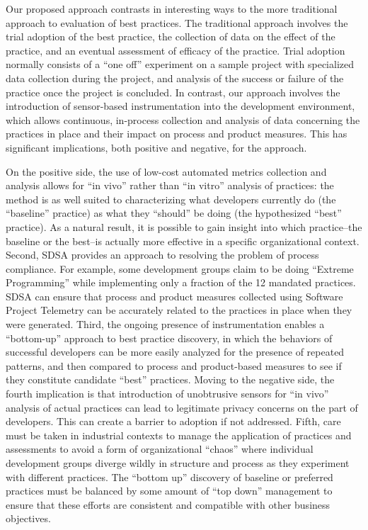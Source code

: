 Our proposed approach contrasts in interesting ways to the more traditional
approach to evaluation of best practices.  The traditional approach
involves the trial adoption of the best practice, the collection of data on
the effect of the practice, and an eventual assessment of efficacy of the
practice.  Trial adoption normally consists of a ``one off'' experiment on
a sample project with specialized data collection during the project, and
analysis of the success or failure of the practice once the project is
concluded.  In contrast, our approach involves the introduction of
sensor-based instrumentation into the development environment, which allows
continuous, in-process collection and analysis of data concerning the
practices in place and their impact on process and product measures.  This
has significant implications, both positive and negative, for the approach.

On the positive side, the use of low-cost automated metrics collection and analysis allows
for ``in vivo'' rather than ``in vitro'' analysis of practices: the method
is as well suited to characterizing what developers currently do (the
``baseline'' practice) as what they ``should'' be doing (the hypothesized
``best'' practice).  As a natural result, it is possible to gain insight
into which practice--the baseline or the best--is actually more effective
in a specific organizational context. Second, SDSA provides an approach to
resolving the problem of process compliance.  For example, some development
groups claim to be doing ``Extreme Programming'' while implementing only a
fraction of the 12 mandated practices.  SDSA can ensure that process and
product measures collected using Software Project Telemetry can be
accurately related to the practices in place when they were generated.
Third, the ongoing presence of instrumentation enables a ``bottom-up''
approach to best practice discovery, in which the behaviors of successful
developers can be more easily analyzed for the presence of repeated
patterns, and then compared to process and product-based measures to see if
they constitute candidate ``best'' practices.  Moving to the negative side,
the fourth implication is that introduction of unobtrusive sensors for ``in
vivo'' analysis of actual practices can lead to legitimate privacy concerns
on the part of developers. This can create a barrier to adoption if not
addressed.  Fifth, care must be taken in industrial contexts to manage the
application of practices and assessments to avoid a form of organizational
``chaos'' where individual development groups diverge wildly in structure
and process as they experiment with different practices. The ``bottom up''
discovery of baseline or preferred practices must be balanced by some amount of ``top
down'' management to ensure that these efforts are consistent and
compatible with other business objectives.

